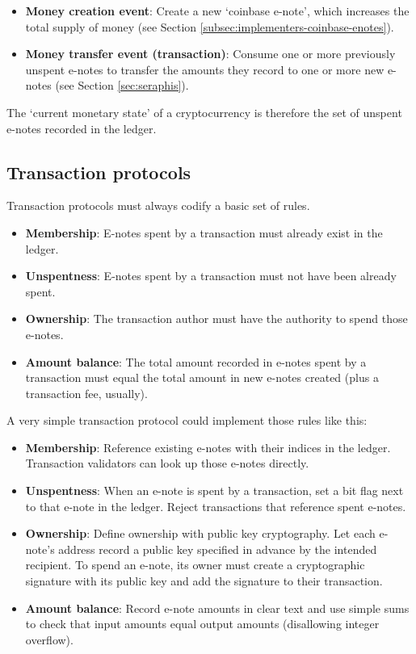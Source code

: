 \begin{itemize}
    \item \textbf{Money creation event}: Create a new `coinbase e-note', which increases the total supply of money (see Section \ref{subsec:implementers-coinbase-enotes}).
    \item \textbf{Money transfer event (transaction)}: Consume one or more previously unspent e-notes to transfer the amounts they record to one or more new e-notes (see Section \ref{sec:seraphis}).
\end{itemize}

The `current monetary state' of a cryptocurrency is therefore the set of unspent e-notes recorded in the ledger.


\subsection{Transaction protocols}
\label{subsec:intro-transaction protocols}

Transaction protocols must always codify a basic set of rules.

\begin{itemize}
    \item \textbf{Membership}: E-notes spent by a transaction must already exist in the ledger.
    \item \textbf{Unspentness}: E-notes spent by a transaction must not have been already spent.
    \item \textbf{Ownership}: The transaction author must have the authority to spend those e-notes.
    \item \textbf{Amount balance}: The total amount recorded in e-notes spent by a transaction must equal the total amount in new e-notes created (plus a transaction fee, usually).
\end{itemize}

A very simple transaction protocol could implement those rules like this:

\begin{itemize}
    \item \textbf{Membership}: Reference existing e-notes with their indices in the ledger. Transaction validators can look up those e-notes directly.
    \item \textbf{Unspentness}: When an e-note is spent by a transaction, set a bit flag next to that e-note in the ledger. Reject transactions that reference spent e-notes.
    \item \textbf{Ownership}: Define ownership with public key cryptography. Let each e-note's address record a public key specified in advance by the intended recipient. To spend an e-note, its owner must create a cryptographic signature with its public key and add the signature to their transaction.
    \item \textbf{Amount balance}: Record e-note amounts in clear text and use simple sums to check that input amounts equal output amounts (disallowing integer overflow).
\end{itemize}

